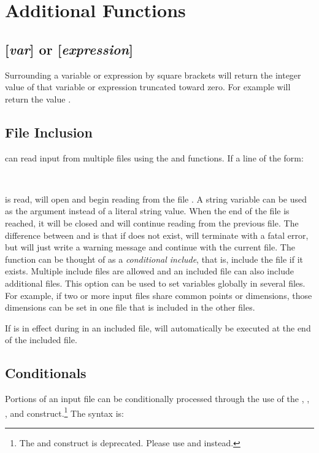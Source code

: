 \section{Additional Functions }

\subsection{[{\em var}] or [{\em expression}]} Surrounding a variable or expression
by square brackets will return the integer value of that variable or
expression truncated toward zero. For example \cmd{[sqrt(2)]} will return the value
.

\subsection{File Inclusion} \aprepro{} can read input from multiple 
files using the  and  functions. If a line 
of the form: 

\\

is read, \aprepro{} will open and begin reading from the file
.  A string variable can be used as the
argument instead of a literal string value.  When the end of the file
is reached, it will be closed and \aprepro{} will continue
reading from the previous file. The difference between
 and  is that if
 does not exist,  will
terminate \aprepro{} with a fatal error, but  will just
write a warning message and continue with the current file. The
 function can be thought of as a {\em conditional
include}, that is, include the file if it exists. Multiple include
files are allowed and an included file can also include additional
files. This option can be used to set variables globally in several
files. For example, if two or more input files share common points or
dimensions, those dimensions can be set in one file that is included
in the other files.

If  is in effect during in an included file,  
will automatically be executed at the end of the included file.

\subsection{Conditionals} Portions of an input file can be conditionally processed 
through the use of the , , , and  
construct.\footnote{The  and  construct is deprecated. Please use  and  instead.}
The syntax is: 

